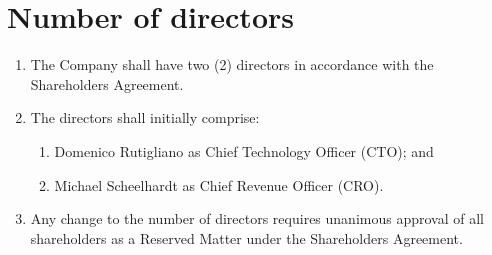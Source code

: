 \section{Number of directors}

\begin{enumerate}[label=(\alph*)]
    \item The Company shall have two (2) directors in accordance with the Shareholders Agreement.
    
    \item The directors shall initially comprise:
    \begin{enumerate}[label=(\roman*)]
        \item Domenico Rutigliano as Chief Technology Officer (CTO); and
        \item Michael Scheelhardt as Chief Revenue Officer (CRO).
    \end{enumerate}
    
    \item Any change to the number of directors requires unanimous approval of all shareholders as a Reserved Matter under the Shareholders Agreement.
\end{enumerate} 